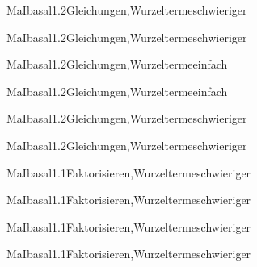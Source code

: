 \documentclass[12pt]{article}
\begin{document}
    \begin{Add}{MaI}{basal1.2}{Gleichungen,Wurzelterme}{schwieriger}
    \solution{ }
    \end{Add}
    \begin{Add}{MaI}{basal1.2}{Gleichungen,Wurzelterme}{schwieriger}
    \end{Add}
    

    \begin{Add}{MaI}{basal1.2}{Gleichungen,Wurzelterme}{einfach}
    \solution{ }
    \end{Add}
    \begin{Add}{MaI}{basal1.2}{Gleichungen,Wurzelterme}{einfach}
    \end{Add}
    

    \begin{Add}{MaI}{basal1.2}{Gleichungen,Wurzelterme}{schwieriger}
    \solution{ }
    \end{Add}
    \begin{Add}{MaI}{basal1.2}{Gleichungen,Wurzelterme}{schwieriger}
    \end{Add}
    

    \begin{Add}{MaI}{basal1.1}{Faktorisieren,Wurzelterme}{schwieriger}
    \solution{ }
    \end{Add}
    \begin{Add}{MaI}{basal1.1}{Faktorisieren,Wurzelterme}{schwieriger}
    \end{Add}
    

    \begin{Add}{MaI}{basal1.1}{Faktorisieren,Wurzelterme}{schwieriger}
    \solution{ }
    \end{Add}
    \begin{Add}{MaI}{basal1.1}{Faktorisieren,Wurzelterme}{schwieriger}
    \end{Add}
    
\end{document}
